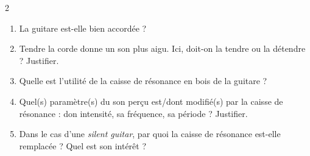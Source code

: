 \documentclass[a4paper,11pt,fleqn]{article}%
\begin{document}
\begin{multicols}{2}
\begin{enumerate}
	\item La guitare est-elle bien accordée ?
	\item Tendre la corde donne un son plus aigu. Ici, doit-on la tendre ou la détendre ? Justifier.
	\item Quelle est l'utilité de la caisse de résonance en bois de la guitare ?
	\item Quel(s) paramètre(s) du son perçu est/dont modifié(s) par la caisse de résonance : don intensité, sa fréquence, sa période ? Justifier.
	\item Dans le cas d'une \emph{silent guitar}, par quoi la caisse de résonance est-elle remplacée ? Quel est son intérêt ?
\end{enumerate}
\end{multicols}
\end{document}
